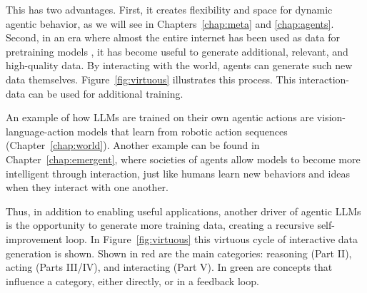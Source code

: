This has two advantages. First, it creates flexibility and space for dynamic agentic  behavior, as we will see in Chapters~\ref{chap:meta} and \ref{chap:agents}. Second, in an era where almost the entire internet has  been used as data for pretraining models \citep{sutskever2024}, it has become useful to generate additional, relevant, and high-quality data.
By interacting with the world, agents can generate such new data themselves. Figure~\ref{fig:virtuous} illustrates this process. This interaction-data can be used for additional training.

An example of how LLMs are trained on their own agentic actions are vision-language-action models that learn from robotic action sequences (Chapter~\ref{chap:world}). %
Another example can be found in Chapter~\ref{chap:emergent}, where societies of agents allow models to become more intelligent through interaction, just like humans learn new behaviors and ideas when they interact with one another. 

Thus, in addition to enabling useful applications,
another driver of agentic LLMs is the opportunity to generate more training data, creating a recursive self-improvement loop. In Figure~\ref{fig:virtuous} this virtuous cycle of interactive data generation is shown. Shown in red are the main categories: reasoning (Part II), acting (Parts III/IV), and interacting (Part V). In green are concepts that influence a category, either directly, or in a  feedback loop.





